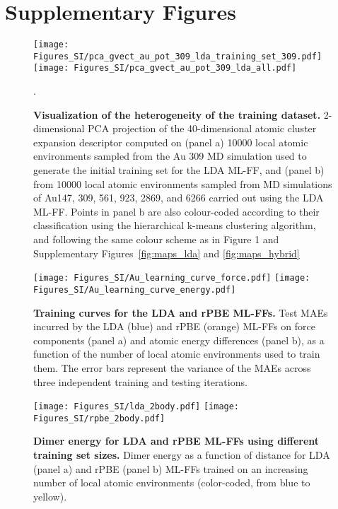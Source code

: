 \documentclass[%
aip,
 amsmath,amssymb,
 reprint,
]{revtex4-1}
\begin{document}
\renewcommand{\thetable}{S\arabic{table}}
\renewcommand{\thefigure}{S\arabic{figure}}

\setcounter{figure}{0}

\section*{Supplementary Figures}
\begin{figure}[h!]
    \centering
    \texttt{[image: Figures\_SI/pca\_gvect\_au\_pot\_309\_lda\_training\_set\_309.pdf]}
    \texttt{[image: Figures\_SI/pca\_gvect\_au\_pot\_309\_lda\_all.pdf]}
    \caption{
    \textbf{Visualization of the heterogeneity of the training dataset.}
    2-dimensional PCA projection of the 40-dimensional atomic cluster expansion descriptor computed on (panel a) 10000 local atomic environments sampled from the Au 309 MD simulation used to generate the initial training set for the LDA ML-FF, and (panel b) from 10000 local atomic environments sampled from MD simulations of Au147, 309, 561, 923, 2869, and 6266 carried out using the LDA ML-FF.
    Points in panel b are also colour-coded according to their classification using the hierarchical k-means clustering algorithm, and following the same colour scheme as in Figure 1 and Supplementary Figures~\ref{fig:maps_lda} and \ref{fig:maps_hybrid}}.
    \label{fig:db}
\end{figure}
%
\begin{figure}[!htb]
    \centering
    \texttt{[image: Figures\_SI/Au\_learning\_curve\_force.pdf]}
    \texttt{[image: Figures\_SI/Au\_learning\_curve\_energy.pdf]}
    \caption{
    \textbf{Training curves for the LDA and rPBE ML-FFs.}
    Test MAEs incurred by the LDA (blue) and rPBE (orange) ML-FFs on force components (panel a) and atomic energy differences (panel b), as a function of the number of local atomic environments used to train them.
    The error bars represent the variance of the MAEs across three independent training and testing iterations.}
    \label{fig:learning_curves}
\end{figure}
%
\begin{figure}[!htb]
    \centering
    \texttt{[image: Figures\_SI/lda\_2body.pdf]}
    \hspace{1cm}
    \texttt{[image: Figures\_SI/rpbe\_2body.pdf]}
    \caption{
    \textbf{Dimer energy for LDA and rPBE ML-FFs using different training set sizes.}
    Dimer energy as a function of distance for LDA (panel a) and rPBE (panel b) ML-FFs trained on an increasing number of local atomic environments (color-coded, from blue to yellow).}
    \label{fig:dimer}
\end{figure}
\end{document}
